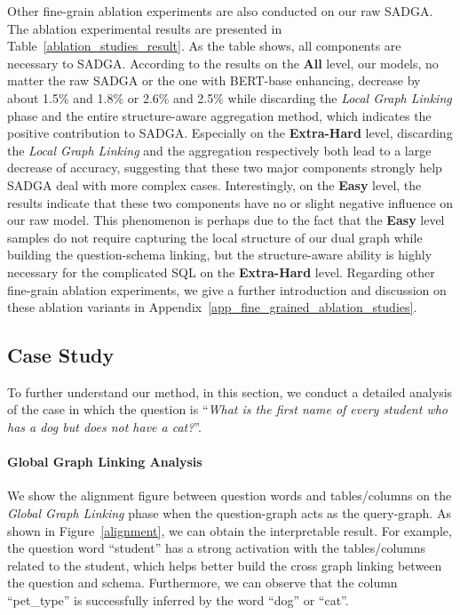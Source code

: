 \documentclass{article}
\begin{document}
Other fine-grain ablation experiments are also conducted on our raw SADGA. The ablation experimental results are presented in Table~\ref{ablation_studies_result}. As the table shows, all components are necessary to SADGA. According to the results on the \textbf{All} level, our models, no matter the raw SADGA or the one with BERT-base enhancing, decrease by about 1.5\% and 1.8\% or 2.6\% and 2.5\% while discarding the \emph{Local Graph Linking} phase and the entire structure-aware aggregation method, which indicates the positive contribution to SADGA. Especially on the \textbf{Extra-Hard} level, discarding the \emph{Local Graph Linking} and the aggregation respectively both lead to a large decrease of accuracy, suggesting that these two major components strongly help SADGA deal with more complex cases. Interestingly, on the \textbf{Easy} level, the results indicate that these two components have no or slight negative influence on our raw model. This phenomenon is perhaps due to the fact that the \textbf{Easy} level samples do not require capturing the local structure of our dual graph while building the question-schema linking, but the structure-aware ability is highly necessary for the complicated SQL on the \textbf{Extra-Hard} level. Regarding other fine-grain ablation experiments, we give a further introduction and discussion on these ablation variants in Appendix~\ref{app_fine_grained_ablation_studies}.

\subsection{Case Study}

To further understand our method, in this section, we conduct a detailed analysis of the case in which the question is ``\textit{What is the first name of every student who has a dog but does not have a cat?}''. 

\paragraph{Global Graph Linking Analysis}
We show the alignment figure between question words and tables/columns on the \emph{Global Graph Linking} phase when the question-graph acts as the query-graph. As shown in Figure~\ref{alignment}, we can obtain the interpretable result. For example, the question word ``student'' has a strong activation with the tables/columns related to the student, which helps better build the cross graph linking between the question and schema. Furthermore, we can observe that the column ``pet\_type'' is successfully inferred by the word ``dog'' or ``cat''.
\end{document}
